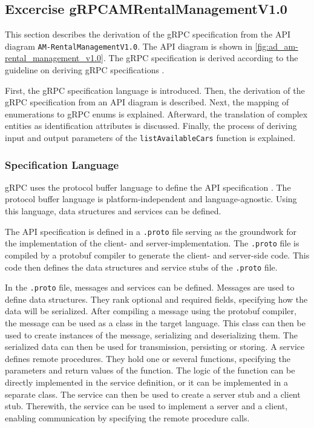 \subsection{Excercise gRPCAMRentalManagementV1.0}
This section describes the derivation of the gRPC specification from the API diagram \texttt{AM-RentalManagementV1.0}.
The API diagram is shown in \autoref{fig:ad_am-rental_management_v1.0}.
The gRPC specification is derived according to the guideline on deriving gRPC specifications \cite{CM-G-RPC}.

First, the gRPC specification language is introduced.
Then, the derivation of the gRPC specification from an API diagram is described.
Next, the mapping of enumerations to gRPC enums is explained.
Afterward, the translation of complex entities as identification attributes is discussed.
Finally, the process of deriving input and output parameters of the \texttt{listAvailableCars} function is explained.

\subsubsection*{Specification Language}
gRPC uses the protocol buffer language to define the API specification \cite{PRO-DOC}.
The protocol buffer language is platform-independent and language-agnostic.
Using this language, data structures and services can be defined.

The API specification is defined in a \texttt{.proto} file serving as the groundwork for the implementation of the client- and server-implementation.
The \texttt{.proto} file is compiled by a protobuf compiler to generate the client- and server-side code.
This code then defines the data structures and service stubs of the \texttt{.proto} file.

In the \texttt{.proto} file, messages and services can be defined.
Messages are used to define data structures.
They rank optional and required fields, specifying how the data will be serialized.
After compiling a message using the protobuf compiler, the message can be used as a class in the target language.
This class can then be used to create instances of the message, serializing and deserializing them.
The serialized data can then be used for transmission, persisting or storing.
A service defines remote procedures.
They hold one or several functions, specifying the parameters and return values of the function.
The logic of the function can be directly implemented in the service definition, or it can be implemented in a separate class.
The service can then be used to create a server stub and a client stub.
Therewith, the service can be used to implement a server and a client, enabling communication by specifying the remote procedure calls.

